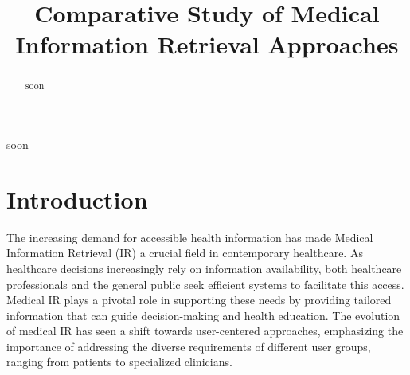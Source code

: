 \documentclass[conference]{IEEEtran}
\begin{document}
\title{Comparative Study of Medical Information Retrieval Approaches}

\graphicspath{ {./images/} }

\makeatletter
\newcommand{\linebreakand}{%
  \end{@IEEEauthorhalign}
  \hfill\mbox{}\par
  \mbox{}\hfill\begin{@IEEEauthorhalign}
}
\makeatother

\author{
    \and
    \and
}

\maketitle

\begin{abstract}
    soon
\end{abstract}

\begin{IEEEkeywords}
    soon
\end{IEEEkeywords}

\section{Introduction}

The increasing demand for accessible health information has made Medical Information Retrieval (IR) a crucial field in contemporary healthcare. As healthcare decisions increasingly rely on information availability, both healthcare professionals and the general public seek efficient systems to facilitate this access. Medical IR plays a pivotal role in supporting these needs by providing tailored information that can guide decision-making and health education. The evolution of medical IR has seen a shift towards user-centered approaches, emphasizing the importance of addressing the diverse requirements of different user groups, ranging from patients to specialized clinicians.
\end{document}
